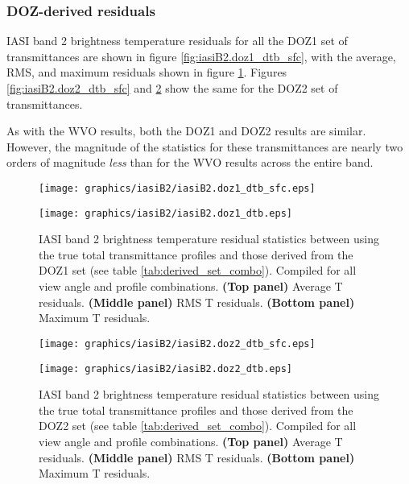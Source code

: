 \subsubsection{DOZ-derived residuals}
IASI band 2 brightness temperature residuals for all the DOZ1 set of transmittances are shown in figure \ref{fig:iasiB2.doz1_dtb_sfc}, with the average, RMS, and maximum residuals shown in figure \ref{fig:iasiB2.doz1_dtb}. Figures \ref{fig:iasiB2.doz2_dtb_sfc} and \ref{fig:iasiB2.doz2_dtb} show the same for the DOZ2 set of transmittances.

As with the WVO results, both the DOZ1 and DOZ2 results are similar. However, the magnitude of the statistics for these transmittances are nearly two orders of magnitude \emph{less} than for the WVO results across the entire band.
\begin{figure}[htp]
  \centering
  \texttt{[image: graphics/iasiB2/iasiB2.doz1\_dtb\_sfc.eps]}
  \caption{IASI band 2 brightness temperature residuals for all view angles and profiles between using the true total transmittance profiles and those derived from the DOZ1 set (see table \ref{tab:derived_set_combo})}
  \label{fig:iasiB2.doz1_dtb_sfc}
  \vspace{1em}
  \texttt{[image: graphics/iasiB2/iasiB2.doz1\_dtb.eps]}
  \caption{IASI band 2 brightness temperature residual statistics between using the true total transmittance profiles and those derived from the DOZ1 set (see table \ref{tab:derived_set_combo}). Compiled for all view angle and profile combinations. \textbf{(Top panel)} Average T residuals. \textbf{(Middle panel)} RMS T residuals. \textbf{(Bottom panel)} Maximum T residuals.}
  \label{fig:iasiB2.doz1_dtb}
\end{figure}
\begin{figure}[htp]
  \centering
  \texttt{[image: graphics/iasiB2/iasiB2.doz2\_dtb\_sfc.eps]}
  \caption{IASI band 2 brightness temperature residuals for all view angles and profiles between using the true total transmittance profiles and those derived from the DOZ2 set (see table \ref{tab:derived_set_combo})}
  \label{fig:iasiB2.doz2_dtb_sfc}
  \vspace{1em}
  \texttt{[image: graphics/iasiB2/iasiB2.doz2\_dtb.eps]}
  \caption{IASI band 2 brightness temperature residual statistics between using the true total transmittance profiles and those derived from the DOZ2 set (see table \ref{tab:derived_set_combo}). Compiled for all view angle and profile combinations. \textbf{(Top panel)} Average T residuals. \textbf{(Middle panel)} RMS T residuals. \textbf{(Bottom panel)} Maximum T residuals.}
  \label{fig:iasiB2.doz2_dtb}
\end{figure}


